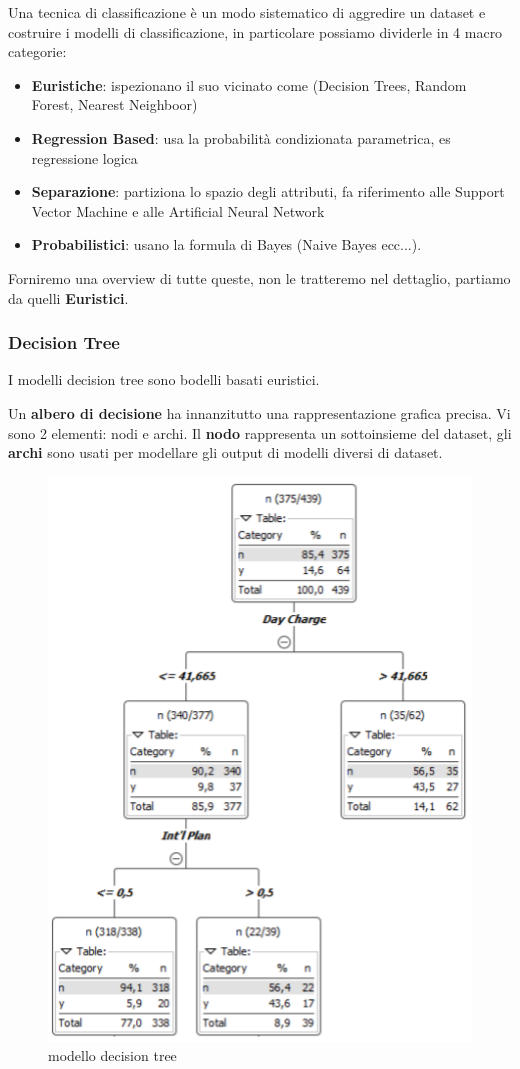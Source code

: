 Una tecnica di classificazione è un modo sistematico di aggredire un dataset e costruire i modelli di classificazione, in particolare possiamo dividerle in 4 macro categorie:
\begin{itemize}
	\item \textbf{Euristiche}: ispezionano il suo vicinato come (Decision Trees, Random Forest, Nearest Neighboor)
	\item \textbf{Regression Based}: usa la probabilità condizionata parametrica, es regressione logica
	\item \textbf{Separazione}: partiziona lo spazio degli attributi, fa riferimento alle Support Vector Machine e alle Artificial Neural Network
	\item \textbf{Probabilistici}: usano la formula di Bayes (Naive Bayes ecc...).
\end{itemize}

Forniremo una overview di tutte queste, non le tratteremo nel dettaglio, partiamo da quelli \textbf{Euristici}.

\subsubsection{Decision Tree}
I modelli decision tree sono bodelli basati euristici. 

Un \textbf{albero di decisione} ha innanzitutto una rappresentazione grafica precisa. Vi sono 2 elementi: nodi e archi. Il \textbf{nodo} rappresenta un sottoinsieme del dataset, gli \textbf{archi} sono usati per modellare gli output di modelli diversi di dataset.

\begin{figure}[H]
	\centering
	\includegraphics[height=0.7 \linewidth]{classification/pict/decision_tree.png}
	\caption{modello decision tree}
\end{figure}


